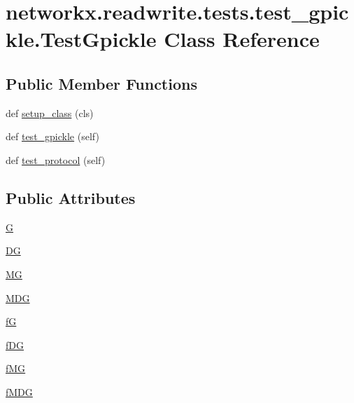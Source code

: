 \hypertarget{classnetworkx_1_1readwrite_1_1tests_1_1test__gpickle_1_1TestGpickle}{}\section{networkx.\+readwrite.\+tests.\+test\+\_\+gpickle.\+Test\+Gpickle Class Reference}
\label{classnetworkx_1_1readwrite_1_1tests_1_1test__gpickle_1_1TestGpickle}
\subsection*{Public Member Functions}
\begin{DoxyCompactItemize}
\item 
def \hyperlink{classnetworkx_1_1readwrite_1_1tests_1_1test__gpickle_1_1TestGpickle_a07f86a56ff715a03358048871a44d53f}{setup\+\_\+class} (cls)
\item 
def \hyperlink{classnetworkx_1_1readwrite_1_1tests_1_1test__gpickle_1_1TestGpickle_a58993e4931424306c4863f56c644e1f8}{test\+\_\+gpickle} (self)
\item 
def \hyperlink{classnetworkx_1_1readwrite_1_1tests_1_1test__gpickle_1_1TestGpickle_ae14d05d937e76436a11d1e9242cabf42}{test\+\_\+protocol} (self)
\end{DoxyCompactItemize}
\subsection*{Public Attributes}
\begin{DoxyCompactItemize}
\item 
\hyperlink{classnetworkx_1_1readwrite_1_1tests_1_1test__gpickle_1_1TestGpickle_a545991953d3b19ea889d0ea8c732c299}{G}
\item 
\hyperlink{classnetworkx_1_1readwrite_1_1tests_1_1test__gpickle_1_1TestGpickle_a916fdf04bae80cd92226868f09d79537}{DG}
\item 
\hyperlink{classnetworkx_1_1readwrite_1_1tests_1_1test__gpickle_1_1TestGpickle_ada7261b82600d00604c0b49f93c1d583}{MG}
\item 
\hyperlink{classnetworkx_1_1readwrite_1_1tests_1_1test__gpickle_1_1TestGpickle_a1510f1c07401126728d2c8e9e3feba60}{M\+DG}
\item 
\hyperlink{classnetworkx_1_1readwrite_1_1tests_1_1test__gpickle_1_1TestGpickle_ab8a31e7b1899f9feec7746fe126764d5}{fG}
\item 
\hyperlink{classnetworkx_1_1readwrite_1_1tests_1_1test__gpickle_1_1TestGpickle_aae53e84e7f8e79cbe2f8544200cafb1a}{f\+DG}
\item 
\hyperlink{classnetworkx_1_1readwrite_1_1tests_1_1test__gpickle_1_1TestGpickle_a9f55e0a3ac88d02afffc22edf74ede67}{f\+MG}
\item 
\hyperlink{classnetworkx_1_1readwrite_1_1tests_1_1test__gpickle_1_1TestGpickle_ae2c1130d71786721d350caf69b12ed74}{f\+M\+DG}
\end{DoxyCompactItemize}


